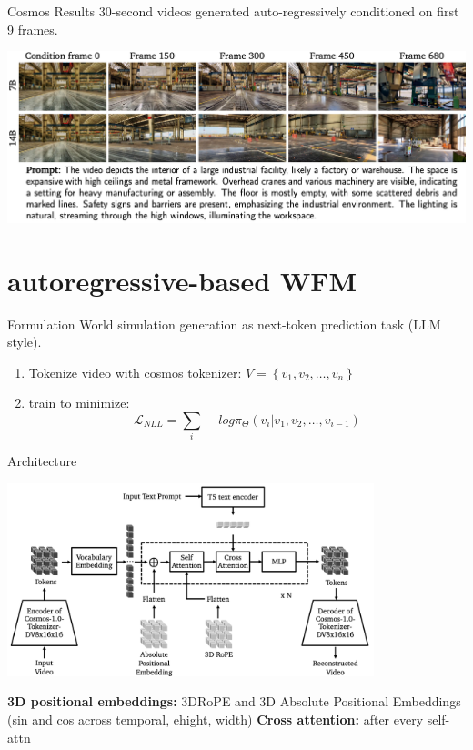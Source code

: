 \documentclass{beamer}
\begin{document}
\begin{frame}{Cosmos Results}
    30-second videos generated auto-regressively conditioned on first 9 frames. 
	\begin{center}
            \includegraphics[width=1.0\textwidth]{./img/diff_arch_result.png}
	\end{center}
\end{frame}

\section{autoregressive-based WFM}
\begin{frame}{Formulation}
    World simulation generation as next-token prediction task (LLM style).\newline
    \vspace{-1em}
    \begin{enumerate}[label=\arabic*.]
        \item Tokenize video with cosmos tokenizer: $V = \left\{v_1, v_2, \dots, v_n \right\}$
        \item train to minimize: \[\mathcal{L}_{NLL} = \sum_i -log \pi_\Theta(v_i | v_1, v_2, \dots, v_{i-1})\]
    \end{enumerate}
\end{frame}

\begin{frame}{Architecture}
	\begin{center}
            \includegraphics[width=0.8\textwidth]{./img/auto_arch.png}
	\end{center}
    \textbf{3D positional embeddings:} 3DRoPE and 3D Absolute Positional Embeddings 
    (sin and cos across temporal, ehight, width)\newline
    \textbf{Cross attention:} after every self-attn \newline

\end{frame}
\end{document}
